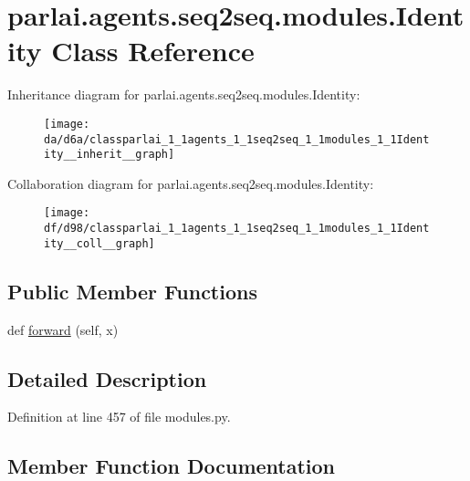 \hypertarget{classparlai_1_1agents_1_1seq2seq_1_1modules_1_1Identity}{}\section{parlai.\+agents.\+seq2seq.\+modules.\+Identity Class Reference}
\label{classparlai_1_1agents_1_1seq2seq_1_1modules_1_1Identity}


Inheritance diagram for parlai.\+agents.\+seq2seq.\+modules.\+Identity\+:
\nopagebreak
\begin{figure}[H]
\begin{center}
\leavevmode
\texttt{[image: da/d6a/classparlai\_1\_1agents\_1\_1seq2seq\_1\_1modules\_1\_1Identity\_\_inherit\_\_graph]}
\end{center}
\end{figure}


Collaboration diagram for parlai.\+agents.\+seq2seq.\+modules.\+Identity\+:
\nopagebreak
\begin{figure}[H]
\begin{center}
\leavevmode
\texttt{[image: df/d98/classparlai\_1\_1agents\_1\_1seq2seq\_1\_1modules\_1\_1Identity\_\_coll\_\_graph]}
\end{center}
\end{figure}
\subsection*{Public Member Functions}
\begin{DoxyCompactItemize}
\item 
def \hyperlink{classparlai_1_1agents_1_1seq2seq_1_1modules_1_1Identity_ab606c0becf72eba3f6453fd5a551aef3}{forward} (self, x)
\end{DoxyCompactItemize}


\subsection{Detailed Description}


Definition at line 457 of file modules.\+py.



\subsection{Member Function Documentation}
\mbox{\label{classparlai_1_1agents_1_1seq2seq_1_1modules_1_1Identity_ab606c0becf72eba3f6453fd5a551aef3}} 
